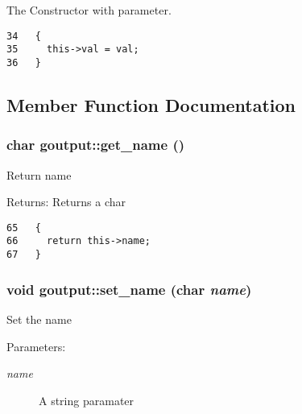 The Constructor with parameter. 

\begin{Code}\begin{verbatim}34   {
35     this->val = val;
36   }
\end{verbatim}\end{Code}




\subsection{Member Function Documentation}
\subsubsection{\setlength{\rightskip}{0pt plus 5cm}char goutput::get\_\-name ()\hspace{0.3cm}{\tt  [inline]}}\label{classgoutput_01be3c8297b3752bc2ece17e8626b3fc}


Return name

\begin{Desc}
\item[Returns:]Returns a char \end{Desc}


\begin{Code}\begin{verbatim}65   {
66     return this->name;
67   }
\end{verbatim}\end{Code}


\subsubsection{\setlength{\rightskip}{0pt plus 5cm}void goutput::set\_\-name (char {\em name})\hspace{0.3cm}{\tt  [inline]}}\label{classgoutput_dffc12cfe953398b21d0b37511a081ed}


Set the name

\begin{Desc}
\item[Parameters:]
\begin{description}
\item[{\em name}]A string paramater \end{description}
\end{Desc}


